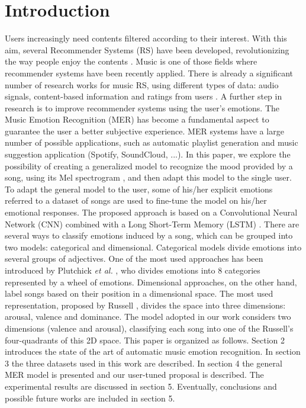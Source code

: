 \documentclass[runningheads]{llncs}
\begin{document}
\section{Introduction}
Users increasingly need contents filtered according to their interest. With this aim, several Recommender Systems (RS) have been developed, revolutionizing the way people enjoy the contents \cite{Konstan2012Apr}. Music is one of those fields where recommender systems have been recently applied. There is already a significant number of research works for music RS, using different types of data: audio signals, content-based information and ratings from users \cite{deep-re-sys-survey}. 
A further step in research is to improve recommender systems using the  user's emotions. The Music Emotion Recognition (MER) has become a fundamental aspect to guarantee the user a better subjective experience. MER systems have a large number of possible applications, such as automatic playlist generation and music suggestion application (Spotify, SoundCloud, ...). In this paper, we explore the possibility of creating a generalized model to recognize the mood provided by a song, using its Mel spectrogram \cite{demircan2020comparison}, and then adapt this model to the single user. To adapt the general model to the user, some of his/her explicit emotions referred to a dataset of songs are used to fine-tune the model on his/her emotional responses. The proposed approach is based on a Convolutional Neural Network (CNN) \cite{krizhevsky2012imagenet} combined with a Long Short-Term Memory (LSTM) \cite{hochreiter1997long}. 
There are several ways to classify emotions induced by a song, which can be grouped into two models: categorical and dimensional. Categorical models divide emotions into several groups of adjectives. One of the most used approaches has been introduced by Plutchick \textit{et al.} \cite{plutchik2013theories}, who divides emotions into 8 categories represented by a wheel of emotions. Dimensional approaches, on the other hand, label songs based on their position in a dimensional space. The most used representation, proposed by Russell \cite{Russel}, divides the space into three dimensions: arousal, valence and dominance. 
The model adopted in our work considers two dimensions (valence and arousal), classifying each song into one of the Russell's four-quadrants of this 2D space.
This paper is organized as follows. Section 2 introduces the state of the art of automatic music emotion recognition. In section 3 the three datasets used in this work are described. In section 4 the general MER model is presented and our user-tuned proposal is described. The experimental results are discussed in section 5. Eventually, conclusions and possible future works are included in section 5. 
\end{document}
